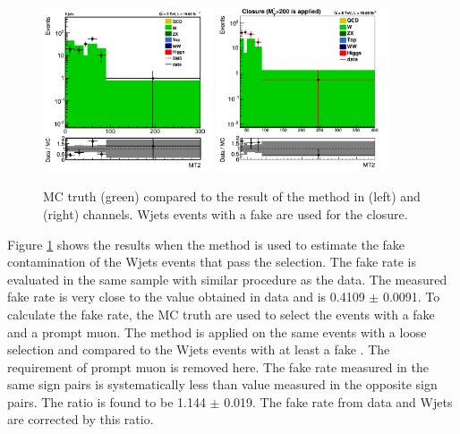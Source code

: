 \begin{figure}[!Hhtb]
\centering
\includegraphics[width=0.45\textwidth,keepaspectratio=true]{FakeRateMuTau/Estimation_pfWJets_ExtraLepExcl_SameSignWeightedHiggs_tauMTApplied.png}
\includegraphics[width=0.45\textwidth,keepaspectratio=true]{FakeRateEleTau/closure_eletau_taumt200.png}
\caption{MC truth (green) compared to the result of the method in \muTau (left) and \eTau (right) channels. Wjets events with a fake \Tau are used for the closure.}
\label{fig:LepTauClusure}
\end{figure}
Figure \ref{fig:LepTauClusure} shows the results when the method is used to estimate the fake contamination of the Wjets events that pass the selection. 
The fake rate is evaluated in the same sample with similar procedure as the data. The measured fake rate is very close to
the value obtained in data and is 0.4109 $\pm$  0.0091. 
To calculate the fake rate, the MC truth are used to select the events with a fake \Tau 
and a prompt muon. The method is applied on the same events with a loose \Tau selection and compared to the Wjets events with at least 
a fake \Tau. The requirement of prompt muon is removed here.
The fake rate measured in the same sign pairs is systematically less than value 
measured in the opposite sign pairs. The ratio is found to be 1.144 $\pm$ 0.019. The fake rate from data and Wjets are corrected by this ratio.
